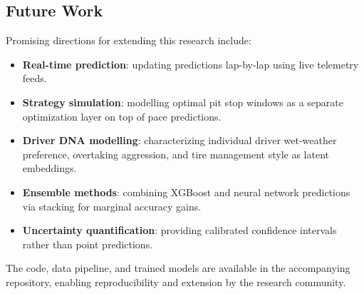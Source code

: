 \subsection{Future Work}

Promising directions for extending this research include:

\begin{itemize}
    \item \textbf{Real-time prediction}: updating predictions lap-by-lap using
          live telemetry feeds.
    \item \textbf{Strategy simulation}: modelling optimal pit stop windows as a
          separate optimization layer on top of pace predictions.
    \item \textbf{Driver DNA modelling}: characterizing individual driver
          wet-weather preference, overtaking aggression, and tire management
          style as latent embeddings.
    \item \textbf{Ensemble methods}: combining XGBoost and neural network
          predictions via stacking for marginal accuracy gains.
    \item \textbf{Uncertainty quantification}: providing calibrated confidence
          intervals rather than point predictions.
\end{itemize}

The code, data pipeline, and trained models are available in the accompanying
repository, enabling reproducibility and extension by the research community.
